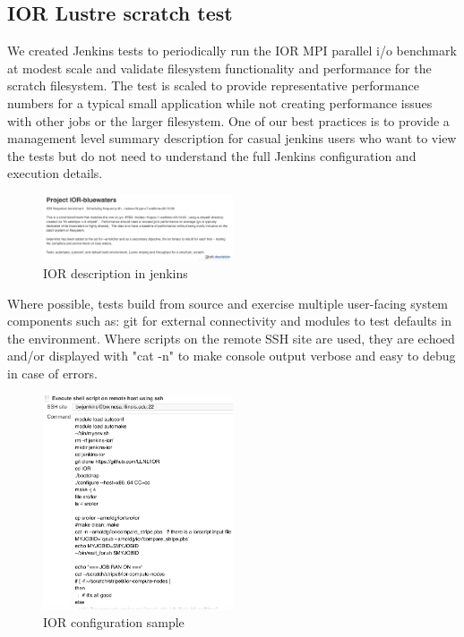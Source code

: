 \documentclass[10pt, conference, compsocconf]{IEEEtran}
\begin{document}
\subsection{IOR Lustre scratch test}
We created Jenkins tests to periodically run the IOR MPI parallel i/o benchmark at modest scale and validate filesystem functionality and performance for the scratch filesystem. The test is scaled to provide representative performance numbers for a typical small application while not creating performance issues with other jobs or the larger filesystem.  One of our best practices is to provide a management level summary description for casual jenkins users who want to view the tests but do not need to understand the full Jenkins configuration and execution details.  
\begin{figure}[H]
\centering
\includegraphics[width=0.5\textwidth]{IOR-bluewaters-descr}
\caption{ IOR description in jenkins }
\label{fig:IOR-bluewaters-descr}
\end{figure}
Where possible, tests build from source and exercise multiple user-facing system components such as: git for external connectivity and modules to test defaults in the environment.  Where scripts on the remote SSH site are used, they are echoed and/or displayed with "cat -n" to make console output verbose and easy to debug in case of errors.  
\begin{figure}[H]
\centering
\includegraphics[width=0.5\textwidth]{IOR-configuration-sample}
\caption{ IOR configuration sample }
\label{fig:IOR-configuration-sample}
\end{figure}
\end{document}
